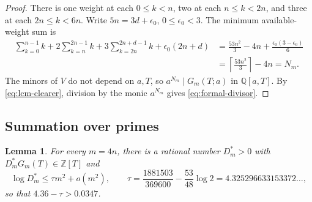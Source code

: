 \documentclass{amsart}
\newtheorem{lemma}{Lemma}[section]
\numberwithin{equation}{section}
\numberwithin{table}{section}
\newcommand{\Z}{\mathbb{Z}}
\begin{document}
\begin{proof}
There is one weight at each $0\le k<n$, two at each $n\le k<2n$, and three
at each $2n\le k<6n$. Write $5n=3d+\epsilon_0$, $0\le\epsilon_0<3$. The minimum available-weight sum is
\begin{align*}
 \sum_{k=0}^{n-1}k+2\sum_{k=n}^{2n-1}k
 +3\sum_{k=2n}^{2n+d-1}k+\epsilon_0(2n+d)
 &=\frac{53n^2}{3}-4n+\frac{\epsilon_0(3-\epsilon_0)}6\\
 &=\left\lceil\frac{53n^2}{3}\right\rceil-4n=N_m.
\end{align*}
The minors of $V$ do not depend on $a,T$, so $a^{N_m}\mid G_m(T;a)$ in
$\mathbb Q[a,T]$. By \eqref{eq:lcm-clearer}, division by the monic
$a^{N_m}$ gives \eqref{eq:formal-divisor}.
\end{proof}

\subsection{Summation over primes}
\begin{lemma}\label{lem:integerization}
For every $m=4n$, there is a rational number $D_m^*>0$ with
$D_m^*G_m(T)\in\Z[T]$ and
\[
 \log D_m^*\le\tau m^2+o(m^2),\qquad
 \tau=\frac{1881503}{369600}-\frac{53}{48}\log2
 =4.325296633153372\ldots,
\]
so that $4.36-\tau>0.0347$.
\end{lemma}
\end{document}
